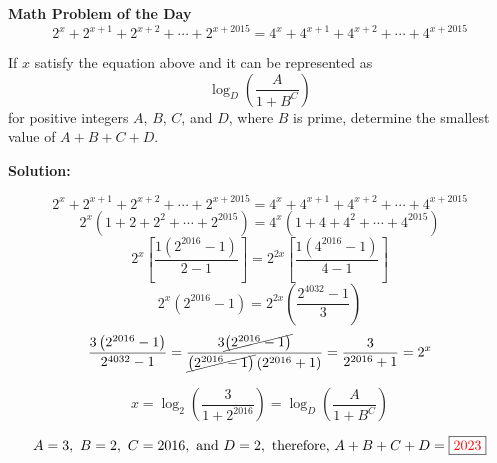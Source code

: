\documentclass[12pt]{article}
\begin{document}
	\centering
		\large{\textbf{Math Problem of the Day}}
	\justify
	\[ 2^x + 2^{x+1} + 2^{x+2} + \dotsb + 2^{x+2015} =  4^x + 4^{x+1} + 4^{x+2} + \dotsb + 4^{x+2015} \]

\noindent
If $x$ satisfy the equation above and it can be represented as \[ \log_{D} \left( \frac{A}{1+B^C} \right) \] for positive integers $A$, $B$, $C$, and $D$, where $B$ is prime, determine the smallest value of $A+B+C+D$.

\bigskip
	\noindent
		\textbf{Solution:}

\[
2^x + 2^{x+1} + 2^{x+2} + \dotsb + 2^{x+2015} =  4^x + 4^{x+1} + 4^{x+2} + \dotsb + 4^{x+2015}
\]
\[
2^x \left( 1+2+2^2+ \dotsb + 2^{2015} \right) = 4^x \left( 1+4+4^2+ \dotsb + 4^{2015} \right)
\]
\[
2^x \left[ \frac{1 \left( 2^{2016} - 1 \right) }{2-1} \right] = 2^{2x} \left[ \frac{1 \left( 4^{2016} - 1 \right)}{4-1} \right] 
\]
\[
2^x \left( 2^{2016} -1 \right) = 2^{2x} \left( \frac{2^{4032} -1 }{3} \right)
\]
\[
\frac{3 \left( 2^{2016} - 1 \right)}{2^{4032}-1} = \frac{3 \cancel{\left( 2^{2016} - 1 \right)}}{ \cancel{\left( 2^{2016}-1 \right)} \left( 2^{2016} + 1 \right)} = \frac{3}{2^{2016}+1} = 2^x
\]

\[ x = \log_{2} \left( \frac{3}{1+2^{2016}} \right) =  \log_{D} \left( \frac{A}{1+B^C} \right) \]

\[A = 3, \ B = 2, \  C = 2016, \ \text{and} \ D = 2, \ \text{therefore,} \ A+B+C+D = \fbox{\textcolor{red}{2023}} \] 
	
\end{document}
